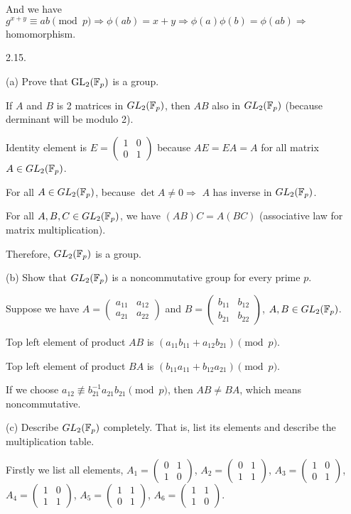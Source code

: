 And we have $g^{x+y} \equiv ab \pmod p \Rightarrow \phi(ab)=x+y \Rightarrow \phi(a)\phi(b) = \phi(ab) \Rightarrow$ homomorphism.

2.15. 
 
(a) Prove that $\text{GL}_2(\mathbb{F}_p)$ is a group.

If $A$ and $B$ is 2 matrices in $GL_2(\mathbb{F}_p)$, then $AB$ also in $GL_2(\mathbb{F}_p)$ (because derminant will be modulo 2).

Identity element is $E = \begin{pmatrix}1 & 0\\0 & 1\end{pmatrix}$ because $AE=EA=A$ for all matrix $A \in GL_2(\mathbb{F}_p)$.

For all $A \in GL_2(\mathbb{F}_p)$, because $\det A \neq 0 \Rightarrow$ $A$ has inverse in $GL_2(\mathbb{F}_p)$.

For all $A, B, C \in GL_2(\mathbb{F}_p)$, we have $(AB)C=A(BC)$ (associative law for matrix multiplication).

Therefore, $GL_2(\mathbb{F}_p)$ is a group.

(b) Show that $GL_2(\mathbb{F}_p)$ is a noncommutative group for every prime $p$.
    
Suppose we have $A = \begin{pmatrix}a_{11} & a_{12} \\ a_{21} & a_{22}\end{pmatrix}$ and $B=\begin{pmatrix}b_{11} & b_{12} \\ b_{21} & b_{22}\end{pmatrix}$, $A, B \in GL_2(\mathbb{F}_p)$.
    
Top left element of product $AB$ is $(a_{11}b_{11}+a_{12}b_{21}) \pmod p$.

Top left element of product $BA$ is $(b_{11}a_{11} + b_{12}a_{21}) \pmod p$.

If we choose $a_{12} \not\equiv b_{21}^{-1}a_{21}b_{21} \pmod p$, then $AB \neq BA$, which means noncommutative.

(c) Describe $GL_2(\mathbb{F}_p)$ completely. That is, list its elements and describe the multiplication table.
    
Firstly we list all elements, $A_1 = \begin{pmatrix}0 & 1\\1 & 0\end{pmatrix}$, $A_2 = \begin{pmatrix}0 & 1\\1 & 1\end{pmatrix}$, $A_3 = \begin{pmatrix}1 & 0\\0 & 1\end{pmatrix}$, $A_4 = \begin{pmatrix}1 & 0\\1 & 1\end{pmatrix}$, $A_5 = \begin{pmatrix}1 & 1\\0 & 1\end{pmatrix}$, $A_6 = \begin{pmatrix}1 & 1\\1 & 0\end{pmatrix}$.
    
